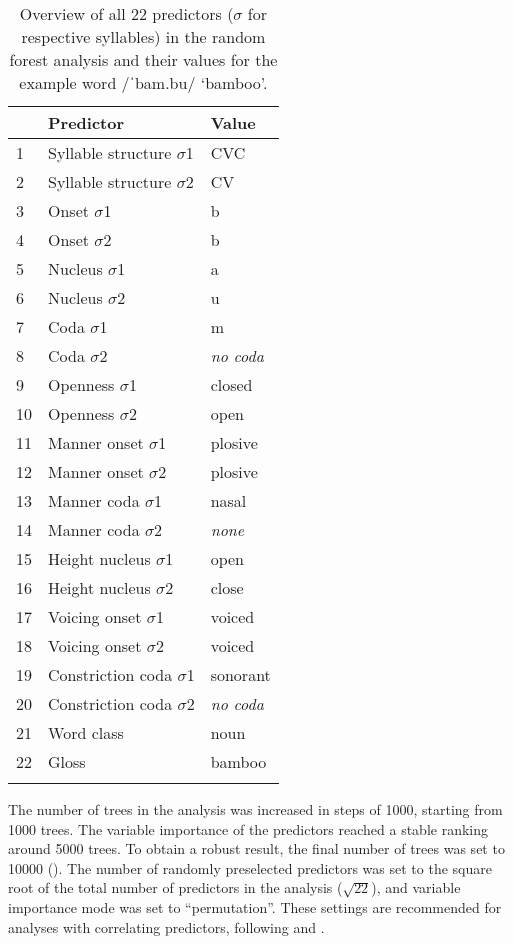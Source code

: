 \begin{table}[t]
\caption{Overview of all 22 predictors ($\sigma$ for respective syllables) in the random forest analysis and their values for the example word /ˈbam.bu/ `bamboo'.}
\label{tab48}
\begin{tabularx}{0.6\textwidth}{p{0.8cm}p{4cm}X} 
\lsptoprule
& Predictor & Value\\
\midrule
1 & Syllable structure $\sigma$1 & CVC\\
2 & Syllable structure $\sigma$2 & CV\\
3 & Onset $\sigma$1 & b\\
4 & Onset $\sigma$2 & b\\
5 & Nucleus $\sigma$1 & a\\
6 & Nucleus $\sigma$2 & u\\
7 & Coda $\sigma$1 & m\\
8 & Coda $\sigma$2 & \textit{no coda}\\
9 & Openness $\sigma$1 & closed\\
10 & Openness $\sigma$2 & open\\
11 & Manner onset $\sigma$1 & plosive\\
12 & Manner onset $\sigma$2 & plosive\\
13 & Manner coda $\sigma$1 & nasal\\
14 & Manner coda $\sigma$2 & \textit{none}\\
15 & Height nucleus $\sigma$1 & open\\
16 & Height nucleus $\sigma$2 & close\\
17 & Voicing onset $\sigma$1 & voiced\\
18 & Voicing onset $\sigma$2 & voiced\\
19 & Constriction coda $\sigma$1 & sonorant\\
20 & Constriction coda $\sigma$2 & \textit{no coda}\\
21 & Word class & noun\\
22 & Gloss & bamboo\\
\lspbottomrule
\end{tabularx}
\end{table}

The number of trees in the analysis was increased in steps of 1000, starting from 1000 trees. The variable importance of the predictors reached a stable ranking around 5000 trees. To obtain a robust result, the final number of trees was set to 10000 (\citealt{shih_random_2013}). The number of randomly preselected predictors was set to the square root of the total number of predictors in the analysis ($\sqrt{22}$), and variable importance mode was set to ``permutation''. These settings are recommended for analyses with correlating predictors, following \citet{strobl_conditional_2008} and \citet{strobl_introduction_2009}.\par

